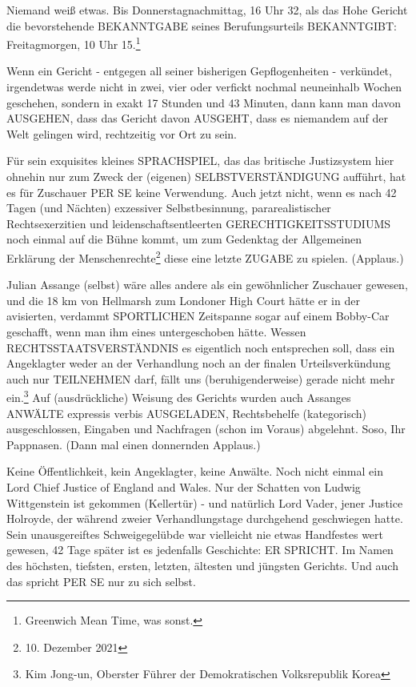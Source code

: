 \begin{multicols}{2}
Niemand weiß etwas. Bis Donnerstagnachmittag, 16 Uhr
32, als das Hohe Gericht die bevorstehende BEKANNTGABE seines Berufungsurteils BEKANNTGIBT: Freitagmorgen, 10 Uhr 15.\footnote[25]{Greenwich Mean Time, was sonst.}

Wenn ein Gericht - entgegen all seiner bisherigen Gepflogenheiten - verkündet, irgendetwas werde nicht in
zwei, vier oder verfickt nochmal neuneinhalb Wochen
geschehen, sondern in exakt 17 Stunden und 43 Minuten, dann kann man davon AUSGEHEN, dass das Gericht davon AUSGEHT, dass es niemandem auf der Welt
gelingen wird, rechtzeitig vor Ort zu sein.

Für sein exquisites kleines SPRACHSPIEL, das das britische Justizsystem hier ohnehin nur zum Zweck der
(eigenen) SELBSTVERSTÄNDIGUNG aufführt, hat es für
Zuschauer PER SE keine Verwendung. Auch jetzt nicht,
wenn es nach 42 Tagen (und Nächten) exzessiver Selbstbesinnung, pararealistischer Rechtsexerzitien und leidenschaftsentleerten
GERECHTIGKEITSSTUDIUMS
noch einmal auf die Bühne kommt, um zum Gedenktag
der Allgemeinen Erklärung der Menschenrechte\footnote[26]{10. Dezember 2021} diese
eine letzte ZUGABE zu spielen. (Applaus.)

Julian Assange (selbst) wäre alles andere als ein gewöhnlicher Zuschauer gewesen, und die 18 km von Hellmarsh
zum Londoner High Court hätte er in der avisierten, verdammt SPORTLICHEN Zeitspanne sogar auf einem Bobby-Car geschafft, wenn man ihm eines untergeschoben
hätte. Wessen RECHTSSTAATSVERSTÄNDNIS es eigentlich noch entsprechen soll, dass ein Angeklagter weder
an der Verhandlung noch an der finalen Urteilsverkündung auch nur TEILNEHMEN darf, fällt uns (beruhigenderweise) gerade nicht mehr ein.\footnote[27]{Kim Jong-un, Oberster Führer der Demokratischen Volksrepublik Korea} Auf (ausdrückliche)
Weisung des Gerichts wurden auch Assanges ANWÄLTE
expressis verbis AUSGELADEN, Rechtsbehelfe (kategorisch) ausgeschlossen, Eingaben und Nachfragen (schon
im Voraus) abgelehnt. Soso, Ihr Pappnasen. (Dann mal
einen donnernden Applaus.)

Keine Öffentlichkeit, kein Angeklagter, keine Anwälte.
Noch nicht einmal ein Lord Chief Justice of England and
Wales. Nur der Schatten von Ludwig Wittgenstein ist gekommen (Kellertür) - und natürlich Lord Vader, jener
Justice Holroyde, der während zweier Verhandlungstage
durchgehend geschwiegen hatte. Sein unausgereiftes
Schweigegelübde war vielleicht nie etwas Handfestes
wert gewesen, 42 Tage später ist es jedenfalls Geschichte:
ER SPRICHT. Im Namen des höchsten, tiefsten, ersten,
letzten, ältesten und jüngsten Gerichts. Und auch das
spricht PER SE nur zu sich selbst.


\end{multicols}

